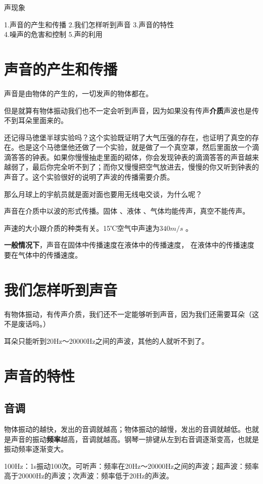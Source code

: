 \documentclass[12pt]{exam}
\newcommand{\keti}{声现象}
\newcommand{\zhongdian}{1.声音的产生和传播 2.我们怎样听到声音 3.声音的特性\\  4.噪声的危害和控制 5.声的利用 }
\begin{document}
\vspace*{80pt}
\keti \par
\zhongdian \par
\section{声音的产生和传播}
声音是由物体的\answerline*[振动]产生的，一切发声的物体都在\answerline*[振动]。

但是就算有物体振动我们也不一定会听到声音，因为如果没有传声\textbf{介质}声波也是传不到耳朵里面来的。

还记得马徳堡半球实验吗？这个实验既证明了大气压强的存在，也证明了真空的存在。也是这个马徳堡他还做了一个实验，就是做了一个真空罩，然后里面放一个滴滴答答的钟表。如果你慢慢抽走里面的砌体，你会发现钟表的滴滴答答的声音越来越弱了，最后你完全听不到了；而你又慢慢把空气放进去，慢慢的你又听到钟表的声音了。这个实验很好的说明了声波的传播需要介质。

那么月球上的宇航员就是面对面也要用无线电交谈，为什么呢？


声音在介质中以波的形式传播。固体 、液体 、气体均能传声，真空不能传声。

声速的大小跟介质的种类有关。15℃空气中声速为$340m/s$ 。

\textbf{一般情况下}，声音在固体中传播速度\answerline*[大于]在液体中的传播速度， 在液体中的传播速度要\answerline*[大于]在气体中的传播速度。

\section{我们怎样听到声音}
有物体振动，有传声介质，我们还不一定能够听到声音，因为我们还需要耳朵（这不是废话吗。）

耳朵只能听到20Hz～20000Hz之间的声波，其他的人就听不到了。

\section{声音的特性}
\subsection{音调}
物体振动的越快，发出的音调就越高；物体振动的越慢，发出的音调就越低。也就是声音的振动\textbf{频率}越高，音调就越高。钢琴一排键从左到右音调逐渐变高，也就是振动频率逐渐变大。

100Hz：1s振动100次。可听声：频率在20Hz～20000Hz之间的声波；超声波：频率高于20000Hz的声波；次声波：频率低于20Hz的声波。
\end{document}

